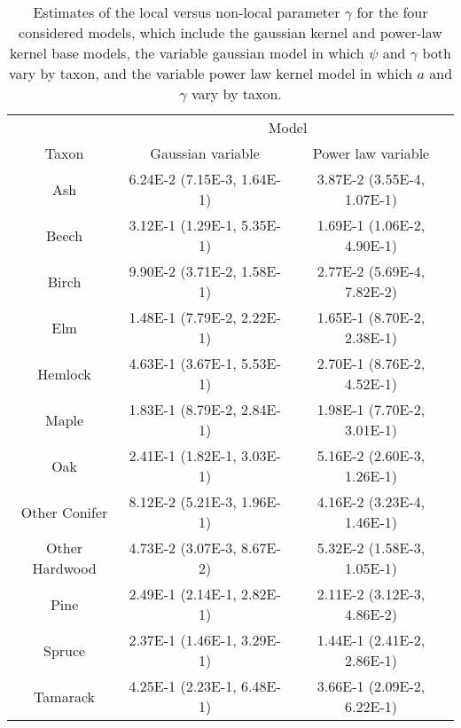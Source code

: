 \begin{table}
\begin{center}
\begin{tabular}{ccc} 
\toprule
               & \multicolumn{2}{c}{Model} \\
Taxon          & Gaussian variable & Power law variable \\  \midrule
           Ash & 6.24E-2 (7.15E-3, 1.64E-1) & 3.87E-2 (3.55E-4, 1.07E-1) \\
         Beech & 3.12E-1 (1.29E-1, 5.35E-1) & 1.69E-1 (1.06E-2, 4.90E-1) \\
         Birch & 9.90E-2 (3.71E-2, 1.58E-1) & 2.77E-2 (5.69E-4, 7.82E-2) \\
           Elm & 1.48E-1 (7.79E-2, 2.22E-1) & 1.65E-1 (8.70E-2, 2.38E-1) \\
       Hemlock & 4.63E-1 (3.67E-1, 5.53E-1) & 2.70E-1 (8.76E-2, 4.52E-1) \\
         Maple & 1.83E-1 (8.79E-2, 2.84E-1) & 1.98E-1 (7.70E-2, 3.01E-1) \\
           Oak & 2.41E-1 (1.82E-1, 3.03E-1) & 5.16E-2 (2.60E-3, 1.26E-1) \\
 Other Conifer & 8.12E-2 (5.21E-3, 1.96E-1) & 4.16E-2 (3.23E-4, 1.46E-1) \\
Other Hardwood & 4.73E-2 (3.07E-3, 8.67E-2) & 5.32E-2 (1.58E-3, 1.05E-1) \\
          Pine & 2.49E-1 (2.14E-1, 2.82E-1) & 2.11E-2 (3.12E-3, 4.86E-2) \\
        Spruce & 2.37E-1 (1.46E-1, 3.29E-1) & 1.44E-1 (2.41E-2, 2.86E-1) \\
      Tamarack & 4.25E-1 (2.23E-1, 6.48E-1) & 3.66E-1 (2.09E-2, 6.22E-1) \\ \bottomrule
\end{tabular}
\caption{Estimates of the local versus non-local parameter $\gamma$ for the four considered models, which include the gaussian kernel and power-law kernel base models, the variable gaussian model in which $\psi$ and $\gamma$ both vary by taxon, and the variable power law kernel model in which $a$ and $\gamma$ vary by taxon.}
\end{center}
\label{table:gamma}
\vspace{2cm}
\end{table}



